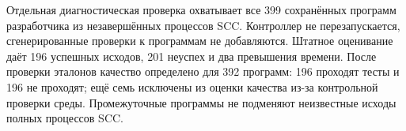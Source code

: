 Отдельная диагностическая проверка охватывает все 399 сохранённых программ разработчика из незавершённых процессов SCC. Контроллер не перезапускается, сгенерированные проверки к программам не добавляются. Штатное оценивание даёт 196 успешных исходов, 201 неуспех и два превышения времени. После проверки эталонов качество определено для 392 программ: 196 проходят тесты и 196 не проходят; ещё семь исключены из оценки качества из-за контрольной проверки среды. Промежуточные программы не подменяют неизвестные исходы полных процессов SCC.

